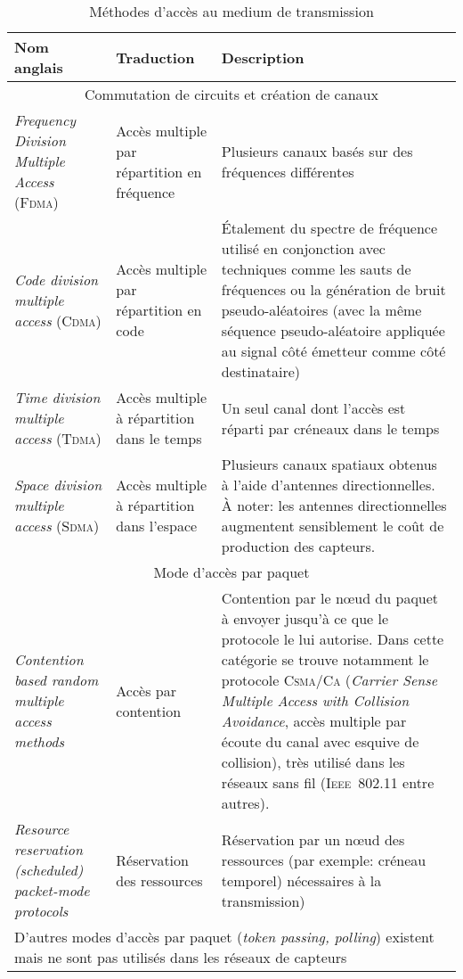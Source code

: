 \begin{table}[!ht]
    \caption{Méthodes d'accès au medium de transmission}\label{ea:tab:mac}
    \centering
    \medskip
    \begin{small}
        \begin{tabular}{m{}|m{}|m{}}
            \toprule
            \textbf{Nom anglais} & \textbf{Traduction} & \textbf{Description}\\
            \midrule
            \multicolumn{3}{c}{Commutation de circuits et création de canaux}\\
            \midrule
            \textit{Frequency Division Multiple Access} (\textsc{Fdma}) & Accès multiple par répartition en fréquence & Plusieurs canaux basés sur des fréquences différentes\\
            \midrule
            \textit{Code division multiple access} (\textsc{Cdma}) & Accès multiple par répartition en code & Étalement du spectre de fréquence utilisé en conjonction avec techniques comme les sauts de fréquences ou la génération de bruit pseudo-aléatoires (avec la même séquence pseudo-aléatoire appliquée au signal côté émetteur comme côté destinataire)\\
            \midrule
            \textit{Time division multiple access} (\textsc{Tdma}) & Accès multiple à répartition dans le temps & Un seul canal dont l'accès est réparti par créneaux dans le temps\\
            \midrule
            \textit{Space division multiple access} (\textsc{Sdma}) & Accès multiple à répartition dans l'espace & Plusieurs canaux spatiaux obtenus à l'aide d'antennes directionnelles. À noter: les antennes directionnelles augmentent sensiblement le coût de production des capteurs.\\
            \midrule
            \multicolumn{3}{c}{Mode d'accès par paquet}\\
            \midrule
            \textit{Contention based random multiple access methods} & Accès par contention & Contention par le nœud du paquet à envoyer jusqu'à ce que le protocole le lui autorise. Dans cette catégorie se trouve notamment le protocole \textsc{Csma/Ca} (\textit{Carrier Sense Multiple Access with Collision Avoidance}, accès multiple par écoute du canal avec esquive de collision), très utilisé dans les réseaux sans fil (\textsc{Ieee~802.11} entre autres).\\
            \midrule
            \textit{Resource reservation (scheduled) packet-mode protocols} & Réservation des ressources & Réservation par un nœud des ressources (par exemple: créneau temporel) nécessaires à la transmission)\\
            \midrule
            \multicolumn{3}{p{.95\textwidth}}{D'autres modes d'accès par paquet (\textit{token passing, polling}) existent mais ne sont pas utilisés dans les réseaux de capteurs}\\
            \bottomrule
         \end{tabular}
     \end{small}
\end{table}

